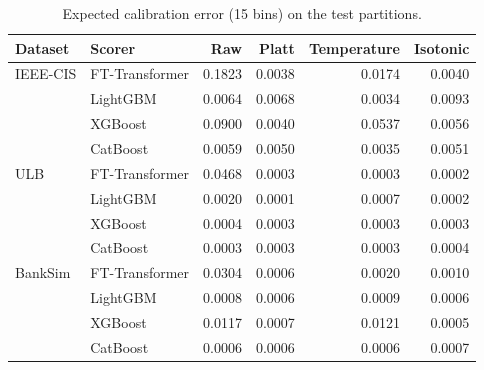 \begin{table}[t]
\centering
\caption{Expected calibration error (15 bins) on the test partitions.}
\label{tab:ece}
\begin{tabular}{llrrrr}
\toprule
Dataset & Scorer & Raw & Platt & Temperature & Isotonic \\
\midrule
IEEE-CIS & FT-Transformer & 0.1823 & 0.0038 & 0.0174 & 0.0040 \\
 & LightGBM & 0.0064 & 0.0068 & 0.0034 & 0.0093 \\
 & XGBoost & 0.0900 & 0.0040 & 0.0537 & 0.0056 \\
 & CatBoost & 0.0059 & 0.0050 & 0.0035 & 0.0051 \\
ULB & FT-Transformer & 0.0468 & 0.0003 & 0.0003 & 0.0002 \\
 & LightGBM & 0.0020 & 0.0001 & 0.0007 & 0.0002 \\
 & XGBoost & 0.0004 & 0.0003 & 0.0003 & 0.0003 \\
 & CatBoost & 0.0003 & 0.0003 & 0.0003 & 0.0004 \\
BankSim & FT-Transformer & 0.0304 & 0.0006 & 0.0020 & 0.0010 \\
 & LightGBM & 0.0008 & 0.0006 & 0.0009 & 0.0006 \\
 & XGBoost & 0.0117 & 0.0007 & 0.0121 & 0.0005 \\
 & CatBoost & 0.0006 & 0.0006 & 0.0006 & 0.0007 \\
\bottomrule
\end{tabular}
\end{table}
